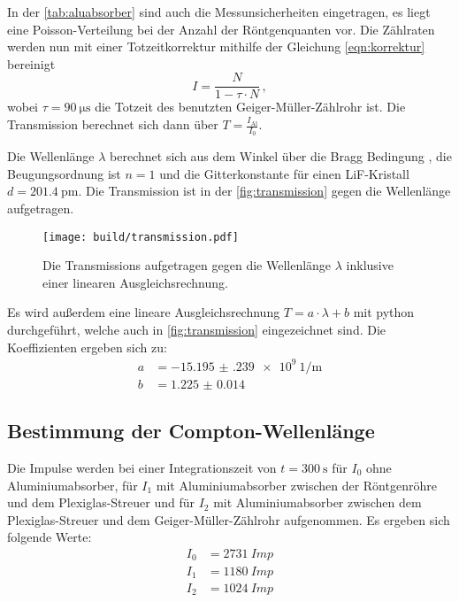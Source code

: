   \noindent In der \autoref{tab:aluabsorber} sind auch die Messunsicherheiten eingetragen, es liegt eine Poisson-Verteilung bei der Anzahl der Röntgenquanten 
  vor. Die Zählraten werden nun mit einer Totzeitkorrektur mithilfe der Gleichung \eqref{eqn:korrektur} bereinigt
  \begin{equation*}
    I = \frac{N}{1 - \tau \cdot N} \, , 
  \end{equation*}
  wobei $\tau = \SI{90}{\micro\second}$ die Totzeit des benutzten Geiger-Müller-Zählrohr ist. Die Transmission berechnet sich dann über $T = \frac{I_{\text{Al}}}{I_0}$.

  \noindent Die Wellenlänge $\lambda $ berechnet sich aus dem Winkel über die Bragg Bedingung , die Beugungsordnung ist $n=1$ und die Gitterkonstante für einen 
  LiF-Kristall $d = \SI{201.4}{\pico\metre}$. Die Transmission ist in der \autoref{fig:transmission} gegen die Wellenlänge aufgetragen.

  \begin{figure}[H]
    \centering
    \texttt{[image: build/transmission.pdf]}
    \caption{Die Transmissions aufgetragen gegen die Wellenlänge $\lambda$ inklusive einer linearen Ausgleichsrechnung.}
    \label{fig:transmission}
  \end{figure}

  \noindent Es wird außerdem eine lineare Ausgleichsrechnung $T = a \cdot \lambda + b$ mit python durchgeführt, welche auch in \autoref{fig:transmission} eingezeichnet 
  sind. Die Koeffizienten ergeben sich zu:
  \begin{align*}
    a &= \SI{-15.195(239)e9}{1\per\metre}\\
    b &= \num{1.225(14)}
  \end{align*}


\subsection{Bestimmung der Compton-Wellenlänge} %

  Die Impulse werden bei einer Integrationszeit von $ t = \SI{300}{\second}$ für $I_0$ ohne Aluminiumabsorber, für $I_1$ mit Aluminiumabsorber zwischen der 
  Röntgenröhre und dem Plexiglas-Streuer und für $I_2$ mit Aluminiumabsorber zwischen dem Plexiglas-Streuer und dem Geiger-Müller-Zählrohr aufgenommen. 
  Es ergeben sich 
  folgende Werte:
  \begin{align*}
    I_0 &= \SI{2731}{Imp}\\
    I_1 &= \SI{1180}{Imp}\\
    I_2 &= \SI{1024}{Imp}
  \end{align*}

